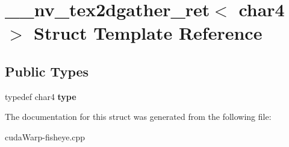 \hypertarget{struct____nv__tex2dgather__ret_3_01char4_01_4}{}\section{\+\_\+\+\_\+nv\+\_\+tex2dgather\+\_\+ret$<$ char4 $>$ Struct Template Reference}
\label{struct____nv__tex2dgather__ret_3_01char4_01_4}
\subsection*{Public Types}
\begin{DoxyCompactItemize}
\item 
typedef char4 {\bfseries type}\hypertarget{struct____nv__tex2dgather__ret_3_01char4_01_4_a86f462c27920a487300648be6de56293}{}\label{struct____nv__tex2dgather__ret_3_01char4_01_4_a86f462c27920a487300648be6de56293}

\end{DoxyCompactItemize}


The documentation for this struct was generated from the following file\+:\begin{DoxyCompactItemize}
\item 
cuda\+Warp-\/fisheye.\+cpp\end{DoxyCompactItemize}
